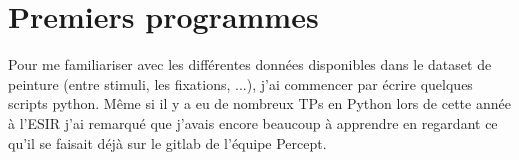 \chapter{Premiers programmes}

\par
Pour me familiariser avec les différentes données disponibles dans le dataset de peinture (entre stimuli, les fixations, ...), j'ai commencer par écrire quelques scripts python. Même si il y a eu de nombreux TPs en Python lors de cette année à l'ESIR j'ai remarqué que j'avais encore beaucoup à apprendre en regardant ce qu'il se faisait déjà sur le gitlab de l'équipe Percept.



